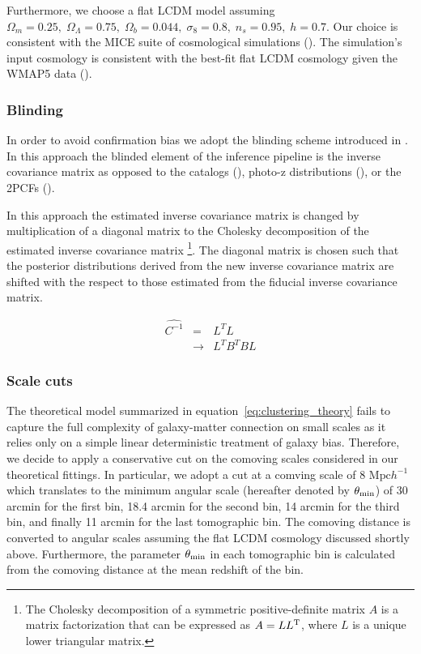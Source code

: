 \documentclass[fleqn,usenatbib,useAMS]{mnras}
\begin{document}
Furthermore, we choose a flat LCDM model assuming $\Omega_m = 0.25, \;\Omega_{\Lambda} = 0.75, \; \Omega_b = 0.044, \; \sigma_{8} = 0.8, \; n_s = 0.95, \; h = 0.7$. Our choice is consistent with the MICE suite of cosmological simulations (\citealt{MICE1}). The simulation's input cosmology is consistent with the best-fit flat LCDM cosmology given the WMAP5 data (\citealt{WMAP5}). 


\subsubsection{Blinding}

In order to avoid confirmation bias we adopt the blinding scheme introduced in \citep{sellentin2019}. In this approach the blinded element of the inference pipeline is the inverse covariance matrix as opposed to the catalogs (\citealt{hendrick2017}), photo-z distributions (\citealt{hendrik2018}), or the 2PCFs (\citealt{muir2019}). 

In this approach the estimated inverse covariance matrix is changed by multiplication of a diagonal matrix to the Cholesky decomposition of the estimated inverse covariance matrix \footnote{The Cholesky decomposition of a symmetric positive-definite matrix $A$ is a matrix factorization that can be expressed as $A = LL^{\rm T}$, where $L$ is a unique lower triangular matrix.}. The diagonal matrix is chosen such that the posterior distributions derived from the new inverse covariance matrix are shifted with the respect to those estimated from the fiducial inverse covariance matrix. 

\begin{eqnarray}
\widehat{C^{-1}} &=& L^{T}L \\
             &\rightarrow& L^{T}B^{T}BL \label{eq:blinded}
\end{eqnarray}

\subsubsection{Scale cuts}\label{sec:scale_cu}

The theoretical model summarized in equation~\ref{eq:clustering_theory} fails to capture the full complexity of galaxy-matter connection on small scales as it relies only on a simple linear deterministic treatment of galaxy bias. Therefore, we decide to apply a conservative cut on the comoving scales considered in our theoretical fittings. In particular, we adopt a cut at a comving scale of 8 $\mathrm{Mpc}h^{-1}$ which translates to the minimum angular scale (hereafter denoted by $\theta_{\rm min}$) of 30 arcmin for the first bin, 18.4 arcmin for the second bin, 14 arcmin for the third bin, and finally 11 arcmin for the last tomographic bin. The comoving distance is converted to angular scales assuming the flat LCDM cosmology discussed shortly above. Furthermore, the parameter $\theta_{\rm min}$ in each tomographic bin is calculated from the comoving distance at the mean redshift of the bin.
\end{document}
